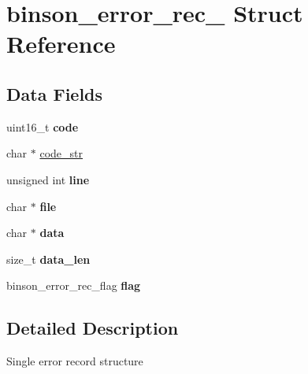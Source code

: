 \hypertarget{structbinson__error__rec__}{\section{binson\-\_\-error\-\_\-rec\-\_\- Struct Reference}
\label{structbinson__error__rec__}
}
\subsection*{Data Fields}
\begin{DoxyCompactItemize}
\item 
\hypertarget{structbinson__error__rec___a70008c0b7822b172472813e6730ea565}{uint16\-\_\-t {\bfseries code}}\label{structbinson__error__rec___a70008c0b7822b172472813e6730ea565}

\item 
char $\ast$ \hyperlink{structbinson__error__rec___a9dc1fc9223483a5bdb7a8a8d02652c5d}{code\-\_\-str}
\item 
\hypertarget{structbinson__error__rec___ae81f92b05f69edc98e6251688e3518da}{unsigned int {\bfseries line}}\label{structbinson__error__rec___ae81f92b05f69edc98e6251688e3518da}

\item 
\hypertarget{structbinson__error__rec___adf16cd437526a5c5e0e0af87745acbb8}{char $\ast$ {\bfseries file}}\label{structbinson__error__rec___adf16cd437526a5c5e0e0af87745acbb8}

\item 
\hypertarget{structbinson__error__rec___a91a70b77df95bd8b0830b49a094c2acb}{char $\ast$ {\bfseries data}}\label{structbinson__error__rec___a91a70b77df95bd8b0830b49a094c2acb}

\item 
\hypertarget{structbinson__error__rec___ace1c2e33b74df8973a7d9a19c935af80}{size\-\_\-t {\bfseries data\-\_\-len}}\label{structbinson__error__rec___ace1c2e33b74df8973a7d9a19c935af80}

\item 
\hypertarget{structbinson__error__rec___ad8934e8b4c4f8e81b45fe2db3ad1735d}{binson\-\_\-error\-\_\-rec\-\_\-flag {\bfseries flag}}\label{structbinson__error__rec___ad8934e8b4c4f8e81b45fe2db3ad1735d}

\end{DoxyCompactItemize}


\subsection{Detailed Description}
Single error record structure 

